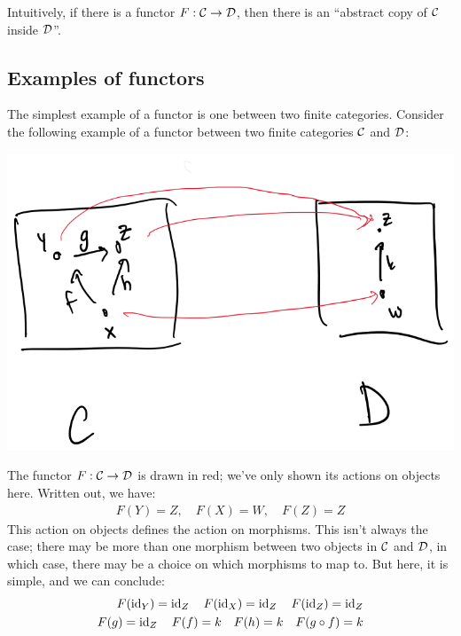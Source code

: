 Intuitively, if there is a functor $F : \mathcal C \to \mathcal D$, then 
there is an ``abstract copy of $\mathcal C$ inside $\mathcal D$''. 




\subsection{Examples of functors}
The simplest example of a functor is one between two finite 
categories. Consider the following example of a functor 
between two finite categories $\mathcal C$ and $\mathcal D$:

\begin{center}
  \includegraphics[width=0.5\linewidth]{fig/func-2.png}
\end{center}

The functor $F : \mathcal C \to \mathcal D$ is drawn in red; 
we've only shown its actions on objects here. Written out, 
we have:
\begin{align*}
  F(Y) = Z, \quad F(X) = W, \quad F(Z) = Z
\end{align*}
This action on objects defines the action on morphisms. 
This isn't always the case; there may be more than one morphism 
between two objects in $\mathcal C$ and $\mathcal D$, in which case, there may 
be a choice on which morphisms to map to. But here, it is simple,
and we can conclude:
\begin{align*}
  F(\operatorname{id}_Y) = \operatorname{id}_Z \quad F(\operatorname{id}_X) = \operatorname{id}_Z \quad F(\operatorname{id}_Z) = \operatorname{id}_Z \\
  F(g) = \operatorname{id}_Z \quad F(f) = k \quad F(h) = k
  \quad F(g \circ f) = k
\end{align*}

